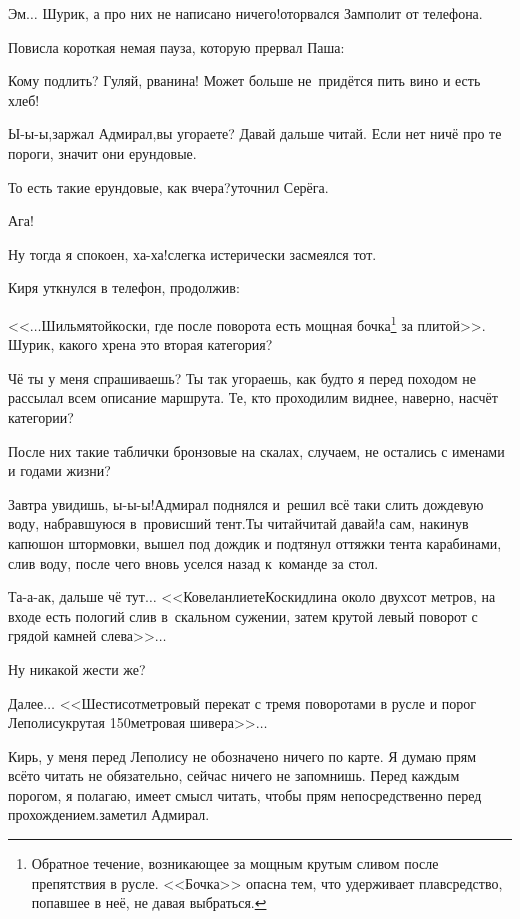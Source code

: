 \diagdash Эм$\ldots$ Шурик, а про них не написано ничего!\mdash оторвался Замполит от телефона.

Повисла короткая немая пауза, которую прервал Паша:

\diagdash Кому подлить? Гуляй, рванина! Может больше не~придётся пить вино и есть хлеб!

\diagdash Ы-ы-ы,\mdash заржал Адмирал,\mdash вы угораете? Давай дальше читай. Если нет ничё про те пороги, значит они ерундовые.

\diagdash То есть такие ерундовые, как вчера?\mdash уточнил Серёга.

\diagdash Ага!

\diagdash Ну тогда я спокоен, ха-ха!\mdash слегка истерически засмеялся тот.

Киря уткнулся в телефон, продолжив:

\renewcommand*{\thefootnote}{\fnsymbol{footnote}}
\setcounter{footnote}{0}
\diagdash <<$\ldots$Шильмятойкоски, где после поворота есть мощная бочка\footnote{Обратное течение, возникающее за мощным крутым сливом после препятствия в русле. <<Бочка>> опасна тем, что удерживает плавсредство, попавшее в неё, не давая выбраться.} за плитой>>. Шурик, какого хрена это вторая категория?

\diagdash Чё ты у меня спрашиваешь? Ты так угораешь, как будто я перед походом не рассылал всем описание маршрута. Те, кто проходил\mdash им виднее, наверно, насчёт категории? 

\diagdash После них такие таблички бронзовые на скалах, случаем, не остались с именами и годами жизни?

\diagdash Завтра увидишь, ы-ы-ы!\mdash Адмирал поднялся и~решил всё таки слить дождевую воду, набравшуюся в~провисший тент.\mdash Ты читай\sdash читай давай!\mdash а сам, накинув капюшон штормовки, вышел под дождик и подтянул оттяжки тента карабинами, слив воду, после чего вновь уселся назад к~команде за стол.

\diagdash Та-а-ак, дальше чё тут$\ldots$ <<Ковеланлиете\sdash Коски\mdash длина около двухсот метров, на входе есть пологий слив в~скальном сужении, затем крутой левый поворот с грядой камней слева>>$\ldots$

\diagdash Ну никакой жести же?

\diagdash Далее$\ldots$ <<Шестисотметровый перекат с тремя поворотами в русле и порог Леполису\mdash крутая 150\sdash метровая шивера>>$\ldots$

\diagdash Кирь, у меня перед Леполису не обозначено ничего по карте. Я думаю прям всё\sdash то читать не обязательно, сейчас ничего не запомнишь. Перед каждым порогом, я полагаю, имеет смысл читать, чтобы прям непосредственно перед прохождением.\mdash заметил Адмирал.


